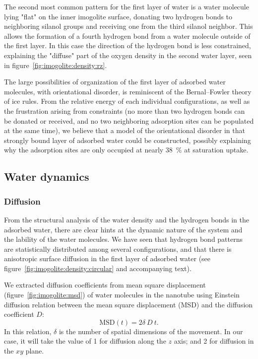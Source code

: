 \documentclass[thesis]{subfiles}
\begin{document}
The second most common pattern for the first layer of water is a water molecule
lying "flat" on the inner imogolite surface, donating two hydrogen bonds to
neighboring silanol groups and receiving one from the third silanol neighbor.
This allows the formation of a fourth hydrogen bond from a water molecule
outside of the first layer. In this case the direction of the hydrogen bond is
less constrained, explaining the "diffuse" part of the oxygen density in the
second water layer, seen in figure~\ref{fig:imogolite:density:rz}.

The large possibilities of organization of the first layer of adsorbed water
molecules, with orientational disorder, is reminiscent of the Bernal--Fowler
theory of ice rules\cite{Bernal1933}. From the relative energy of each
individual configurations, as well as the frustration arising from constraints
(no more than two hydrogen bonds can be donated or received, and no two neighboring
adsorption sites can be populated at the same time), we believe that a model of
the orientational disorder in that strongly bound layer of adsorbed water could
be constructed, possibly explaining why the adsorption sites are only occupied
at nearly 38~\% at saturation uptake.

\subsection{Water dynamics}

\subsubsection{Diffusion}

From the structural analysis of the water density and the hydrogen bonds in the
adsorbed water, there are clear hints at the dynamic nature of the system and
the lability of the water molecules. We have seen that hydrogen bond patterns
are statistically distributed among several configurations, and that there is
anisotropic surface diffusion in the first layer of adsorbed water (see
figure~\ref{fig:imogolite:density:circular} and accompanying text).

We extracted diffusion coefficients from mean square displacement
(figure~\ref{fig:imogolite:msd}) of water molecules in the nanotube using
Einstein diffusion relation between the mean square displacement (MSD) and the
diffusion coefficient $D$:
\[ \text{MSD}(t) = 2 \delta \ D \ t. \]
In this relation, $\delta$ is the number of spatial dimensions of the movement.
In our case, it will take the value of 1 for diffusion along the $z$ axis; and 2
for diffusion in the $xy$ plane.
\end{document}
